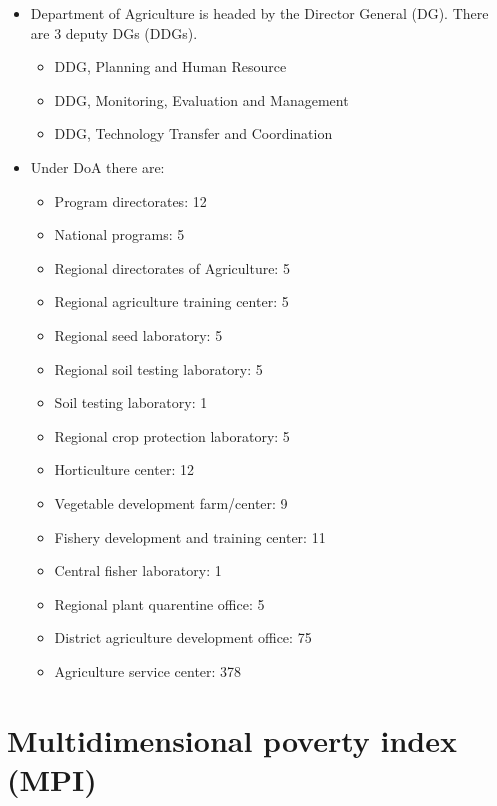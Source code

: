 \documentclass[
  openany]{book}
\providecommand{\tightlist}{%
  \setlength{\itemsep}{0pt}\setlength{\parskip}{0pt}}
\begin{document}
\begin{itemize}
\tightlist
\item
  Department of Agriculture is headed by the Director General (DG). There are 3 deputy DGs (DDGs).

  \begin{itemize}
  \tightlist
  \item
    DDG, Planning and Human Resource
  \item
    DDG, Monitoring, Evaluation and Management
  \item
    DDG, Technology Transfer and Coordination
  \end{itemize}
\item
  Under DoA there are:

  \begin{itemize}
  \tightlist
  \item
    Program directorates: 12
  \item
    National programs: 5
  \item
    Regional directorates of Agriculture: 5
  \item
    Regional agriculture training center: 5
  \item
    Regional seed laboratory: 5
  \item
    Regional soil testing laboratory: 5
  \item
    Soil testing laboratory: 1
  \item
    Regional crop protection laboratory: 5
  \item
    Horticulture center: 12
  \item
    Vegetable development farm/center: 9
  \item
    Fishery development and training center: 11
  \item
    Central fisher laboratory: 1
  \item
    Regional plant quarentine office: 5
  \item
    District agriculture development office: 75
  \item
    Agriculture service center: 378
  \end{itemize}
\end{itemize}

\hypertarget{multidimensional-poverty-index-mpi}{%
\section{Multidimensional poverty index (MPI)}\label{multidimensional-poverty-index-mpi}}
\end{document}
